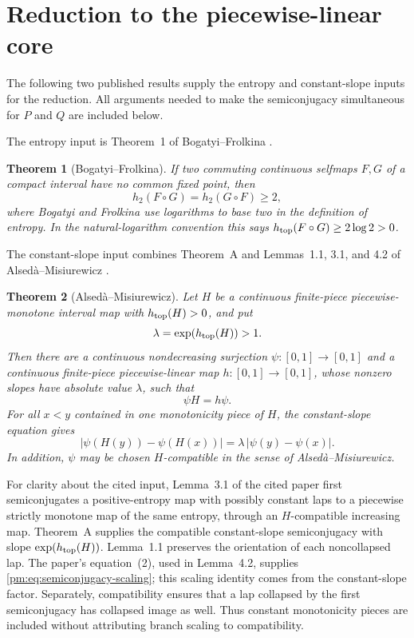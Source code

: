 \documentclass[11pt]{article}
\newtheorem{theorem}{Theorem}
\theoremstyle{definition}
\theoremstyle{remark}
\newcommand{\I}{[0,1]}
\begin{document}
\clearpage
\section{Reduction to the piecewise-linear core}

The following two published results supply the entropy and constant-slope
inputs for the reduction.  All arguments needed to make the semiconjugacy
simultaneous for $P$ and $Q$ are included below.

The entropy input is Theorem~1 of Bogatyi--Frolkina
\cite[Theorem~1]{BogatyiFrolkina}.
\begin{theorem}[Bogatyi--Frolkina]
\label{pm:thm:BF}
If two commuting continuous selfmaps $F,G$ of a compact interval have no
common fixed point, then
\[
 h_2(F\circ G)=h_2(G\circ F)\geq2,
\]
where Bogatyi and Frolkina use logarithms to base two in the definition of
entropy.  In the natural-logarithm convention this says
\(h_{\rm top}(F\circ G)\geq2\log2>0\).
\end{theorem}

The constant-slope input combines Theorem~A and Lemmas~1.1, 3.1, and 4.2
of Alsed\`a--Misiurewicz
\cite[Theorem~A and Lemmas~1.1, 3.1, 4.2]{AlsedaMisiurewicz}.
\begin{theorem}[Alsed\`a--Misiurewicz]
\label{pm:thm:constant-slope}
Let $H$ be a continuous finite-piece piecewise-monotone interval map with
$h_{\rm top}(H)>0$, and put
\[
 \lambda=\exp(h_{\rm top}(H))>1.
\]
Then there are a continuous nondecreasing surjection
$\psi:\I\to\I$ and a continuous finite-piece piecewise-linear map
$h:\I\to\I$, whose nonzero slopes have absolute value $\lambda$, such that
\[
 \psi H=h\psi.
\]
For all $x<y$ contained in one monotonicity piece of $H$, the
constant-slope equation gives
\begin{equation}\label{pm:eq:semiconjugacy-scaling}
 |\psi(H(y))-\psi(H(x))|
 =\lambda\,|\psi(y)-\psi(x)|.
\end{equation}
In addition, $\psi$ may be chosen $H$-compatible in the sense of
Alsed\`a--Misiurewicz.
\end{theorem}

For clarity about the cited input, Lemma~3.1 of the cited paper first
semiconjugates a positive-entropy map with possibly constant laps to a
piecewise strictly monotone map of the same entropy, through an
$H$-compatible increasing map.  Theorem~A supplies the compatible
constant-slope semiconjugacy with slope
\(\exp(h_{\rm top}(H))\).  Lemma~1.1 preserves the orientation of each
noncollapsed lap.  The paper's equation~(2), used in Lemma~4.2, supplies
\eqref{pm:eq:semiconjugacy-scaling}; this scaling identity comes from the
constant-slope factor.  Separately, compatibility ensures that a lap
collapsed by the first semiconjugacy has collapsed image as well.  Thus
constant monotonicity pieces are included without attributing branch
scaling to compatibility.
\end{document}
